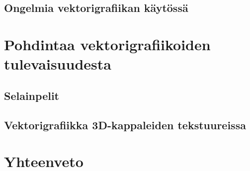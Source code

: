 \documentclass[utf8,bachelor]{gradu3}
\begin{document}
\section{Ongelmia vektorigrafiikan käytössä}

\chapter{Pohdintaa vektorigrafiikoiden tulevaisuudesta}

\section{Selainpelit}

\section{Vektorigrafiikka 3D-kappaleiden tekstuureissa}

\chapter{Yhteenveto}

\printbibliography
\end{document}
